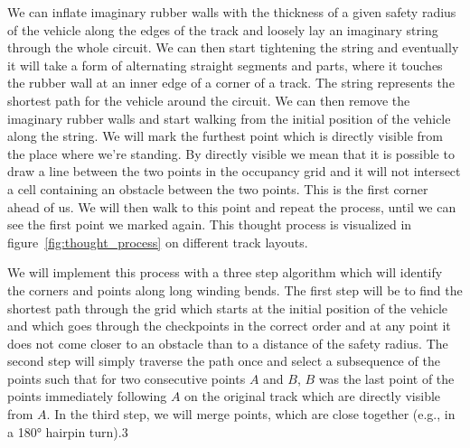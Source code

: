 We can inflate imaginary rubber walls with the thickness of a given safety radius of the vehicle along the edges of the track and loosely lay an imaginary string through the whole circuit. We can then start tightening the string and eventually it will take a form of alternating straight segments and parts, where it touches the rubber wall at an inner edge of a corner of a track. The string represents the shortest path for the vehicle around the circuit. We can then remove the imaginary rubber walls and start walking from the initial position of the vehicle along the string. We will mark the furthest point which is directly visible from the place where we're standing. By directly visible we mean that it is possible to draw a line between the two points in the occupancy grid and it will not intersect a cell containing an obstacle between the two points. This is the first corner ahead of us. We will then walk to this point and repeat the process, until we can see the first point we marked again. This thought process is visualized in figure~\ref{fig:thought_process} on different track layouts.


We will implement this process with a three step algorithm which will identify the corners and points along long winding bends. The first step will be to find the shortest path through the grid which starts at the initial position of the vehicle and which goes through the checkpoints in the correct order and at any point it does not come closer to an obstacle than to a distance of the safety radius. The second step will simply traverse the path once and select a subsequence of the points such that for two consecutive points $A$ and $B$, $B$ was the last point of the points immediately following $A$ on the original track which are directly visible from $A$. In the third step, we will merge points, which are close together (e.g., in a 180° hairpin turn).3

